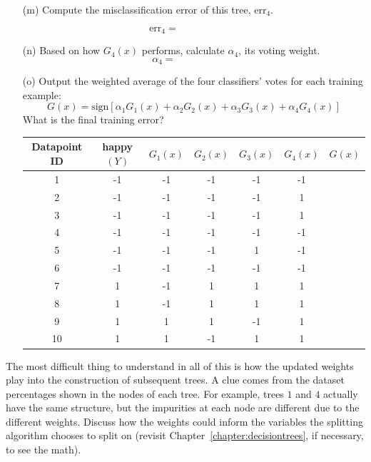 \begin{enumerate}
\item[(m)] Compute the misclassification error of this tree, $\text{err}_4$. 

$$ \text{err}_4 = \qquad \qquad \qquad $$
\vspace{3mm}

\item[(n)] Based on how $G_4(x)$ performs, calculate $\alpha_4$, its voting weight.
$$ \alpha_4 = \qquad \qquad \qquad $$

\item[(o)] Output the weighted average of the four classifiers' votes for each training example:
$$ G(x) = \text{sign}\left[ \alpha_1 G_1(x) + \alpha_2 G_2(x) + \alpha_3 G_3(x) + \alpha_4 G_4(x) \right] $$ 
What is the final training error? 
\vspace{3mm}
{\small
\begin{center}
\begin{tabular}{cccccc|c}
\toprule
Datapoint ID & happy $(Y)$ & $G_1(x)$ & $G_2(x)$ & $G_3(x)$ & $G_4(x)$ & $G(x)$ \\
\midrule
1 & -1 & -1 & -1 & -1 & -1 & \\
2 & -1 & -1 & -1 & -1 & 1 & \\
3 & -1 & -1 & -1 & -1 & 1 & \\
4 & -1 & -1 & -1 & -1 & -1 & \\
5 & -1 & -1 & -1 & 1 & -1 & \\
6 & -1 & -1 & -1 & -1 & -1 & \\
\midrule
7 & 1 & -1 & 1 & 1 & 1 & \\
8 & 1 & -1 & 1 & 1 & 1 & \\
9 & 1 & 1 & 1 & -1 & 1 & \\
10 & 1 & 1 & -1 & 1 & 1 & \\
\bottomrule
\end{tabular}
\end{center}
}
\end{enumerate} 

\vspace{3mm}

\begin{question}{}
The most difficult thing to understand in all of this is how the updated weights play into the construction of subsequent trees. A clue comes from the dataset percentages shown in the nodes of each tree. For example, trees $1$ and $4$ actually have the same structure, but the impurities at each node are different due to the different weights. Discuss how the weights could inform the variables the splitting algorithm chooses to split on (revisit Chapter~\ref{chapter:decisiontrees}, if necessary, to see the math). 
\end{question}

